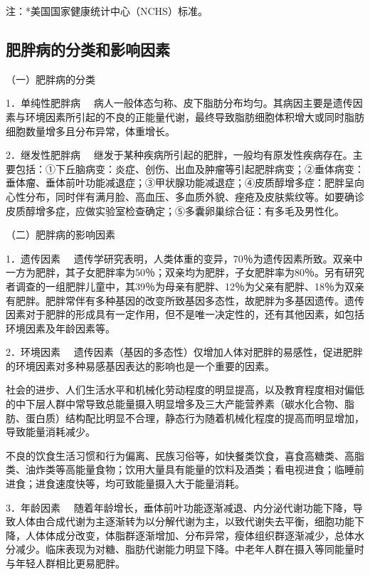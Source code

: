 注：*美国国家健康统计中心（NCHS）标准。

\hypertarget{text00004.htmlux5cux23mllj13}{%
\subsection{肥胖病的分类和影响因素}\label{text00004.htmlux5cux23mllj13}}

（一）肥胖病的分类

{1．单纯性肥胖病}
　病人一般体态匀称、皮下脂肪分布均匀。其病因主要是遗传因素与环境因素所引起的不良的正能量代谢，最终导致脂肪细胞体积增大或同时脂肪细胞数量增多且分布异常，体重增长。

{2．继发性肥胖病}
　继发于某种疾病所引起的肥胖，一般均有原发性疾病存在。主要包括：①下丘脑病变：炎症、创伤、出血及肿瘤等引起肥胖病变；②垂体病变：垂体瘤、垂体前叶功能减退症；③甲状腺功能减退症；④皮质醇增多症：肥胖呈向心性分布，同时伴有满月脸、高血压、多血质外貌、痤疮及皮肤紫纹等。如要确诊皮质醇增多症，应做实验室检查确定；⑤多囊卵巢综合征：有多毛及男性化。

（二）肥胖病的影响因素

{1．遗传因素}
　遗传学研究表明，人类体重的变异，70％为遗传因素所致。双亲中一方为肥胖，其子女肥胖率为50％；双亲均为肥胖，子女肥胖率为80％。另有研究者调查的一组肥胖儿童中，其39％为母亲有肥胖、12％为父亲有肥胖、18％为双亲有肥胖。肥胖常伴有多种基因的改变所致基因多态性，故肥胖为多基因遗传。遗传因素对于肥胖的形成具有一定作用，但不是唯一决定性的，还有其他因素，如包括环境因素及年龄因素等。

{2．环境因素}
　遗传因素（基因的多态性）仅增加人体对肥胖的易感性，促进肥胖的环境因素对多种易感基因表达的影响也是一个重要的因素。

社会的进步、人们生活水平和机械化劳动程度的明显提高，以及教育程度相对偏低的中下层人群中常导致总能量摄入明显增多及三大产能营养素（碳水化合物、脂肪、蛋白质）结构配比明显不合理，静态行为随着机械化程度的提高而明显增加，导致能量消耗减少。

不良的饮食生活习惯和行为偏离、民族习俗等，如快餐类饮食，喜食高糖类、高脂类、油炸类等高能量食物；饮用大量具有能量的饮料及酒类；看电视进食；临睡前进食；进食速度快等，均可致能量摄入大于能量消耗。

{3．年龄因素}
　随着年龄增长，垂体前叶功能逐渐减退、内分泌代谢功能下降，导致人体由合成代谢为主逐渐转为以分解代谢为主，以致代谢失去平衡，细胞功能下降，人体体成分改变，体脂群逐渐增加、分布异常，瘦体组织群逐渐减少，总体水分减少。临床表现为对糖、脂肪代谢能力明显下降。中老年人群在摄入等同能量时与年轻人群相比更易肥胖。

